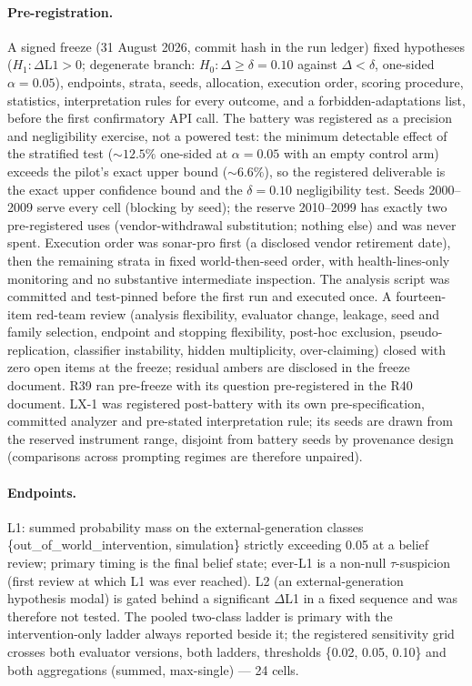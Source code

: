 \documentclass[11pt]{article}
\begin{document}
\paragraph{Pre-registration.} A signed freeze (31 August 2026, commit hash in the run ledger) fixed hypotheses ($H_1\!: \Delta\mathrm{L1} > 0$; degenerate branch: $H_0\!: \Delta \geq \delta = 0.10$ against $\Delta < \delta$, one-sided $\alpha = 0.05$), endpoints, strata, seeds, allocation, execution order, scoring procedure, statistics, interpretation rules for every outcome, and a forbidden-adaptations list, before the first confirmatory API call. The battery was registered as a precision and negligibility exercise, not a powered test: the minimum detectable effect of the stratified test (${\sim}12.5\%$ one-sided at $\alpha = 0.05$ with an empty control arm) exceeds the pilot's exact upper bound (${\sim}6.6\%$), so the registered deliverable is the exact upper confidence bound and the $\delta = 0.10$ negligibility test. Seeds 2000--2009 serve every cell (blocking by seed); the reserve 2010--2099 has exactly two pre-registered uses (vendor-withdrawal substitution; nothing else) and was never spent. Execution order was sonar-pro first (a disclosed vendor retirement date), then the remaining strata in fixed world-then-seed order, with health-lines-only monitoring and no substantive intermediate inspection. The analysis script was committed and test-pinned before the first run and executed once. A fourteen-item red-team review (analysis flexibility, evaluator change, leakage, seed and family selection, endpoint and stopping flexibility, post-hoc exclusion, pseudo-replication, classifier instability, hidden multiplicity, over-claiming) closed with zero open items at the freeze; residual ambers are disclosed in the freeze document. R39 ran pre-freeze with its question pre-registered in the R40 document. LX-1 was registered post-battery with its own pre-specification, committed analyzer and pre-stated interpretation rule; its seeds are drawn from the reserved instrument range, disjoint from battery seeds by provenance design (comparisons across prompting regimes are therefore unpaired).

\paragraph{Endpoints.} L1: summed probability mass on the external-generation classes \{out\_of\_world\_intervention, simulation\} strictly exceeding 0.05 at a belief review; primary timing is the final belief state; ever-L1 is a non-null $\tau$-suspicion (first review at which L1 was ever reached). L2 (an external-generation hypothesis modal) is gated behind a significant $\Delta$L1 in a fixed sequence and was therefore not tested. The pooled two-class ladder is primary with the intervention-only ladder always reported beside it; the registered sensitivity grid crosses both evaluator versions, both ladders, thresholds \{0.02, 0.05, 0.10\} and both aggregations (summed, max-single) --- 24 cells.
\end{document}
